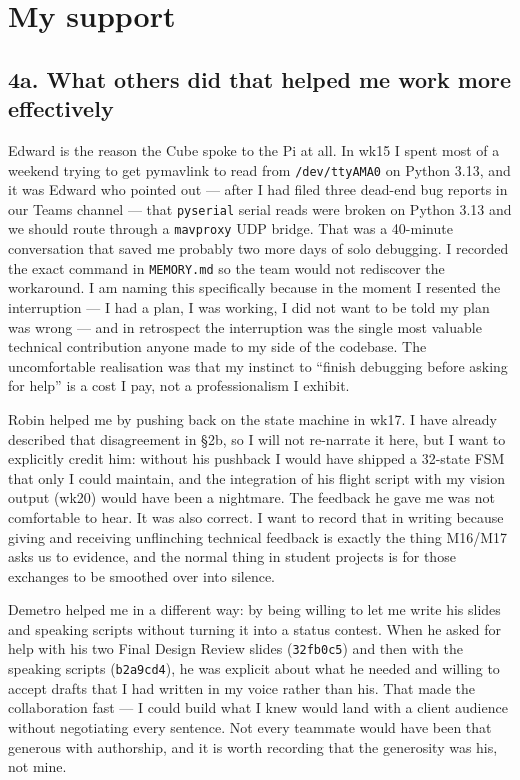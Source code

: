 \section{My support}

\subsection*{4a. What others did that helped me work more effectively}

Edward is the reason the Cube spoke to the Pi at all. In wk15 I spent most of a weekend trying to get pymavlink to read from \texttt{/dev/ttyAMA0} on Python 3.13, and it was Edward who pointed out --- after I had filed three dead-end bug reports in our Teams channel --- that \texttt{pyserial} serial reads were broken on Python 3.13 and we should route through a \texttt{mavproxy} UDP bridge. That was a 40-minute conversation that saved me probably two more days of solo debugging. I recorded the exact command in \texttt{MEMORY.md} so the team would not rediscover the workaround. I am naming this specifically because in the moment I resented the interruption --- I had a plan, I was working, I did not want to be told my plan was wrong --- and in retrospect the interruption was the single most valuable technical contribution anyone made to my side of the codebase. The uncomfortable realisation was that my instinct to ``finish debugging before asking for help'' is a cost I pay, not a professionalism I exhibit.

Robin helped me by pushing back on the state machine in wk17. I have already described that disagreement in §2b, so I will not re-narrate it here, but I want to explicitly credit him: without his pushback I would have shipped a 32-state FSM that only I could maintain, and the integration of his flight script with my vision output (wk20) would have been a nightmare. The feedback he gave me was not comfortable to hear. It was also correct. I want to record that in writing because giving and receiving unflinching technical feedback is exactly the thing M16/M17 asks us to evidence, and the normal thing in student projects is for those exchanges to be smoothed over into silence.

Demetro helped me in a different way: by being willing to let me write his slides and speaking scripts without turning it into a status contest. When he asked for help with his two Final Design Review slides (\texttt{32fb0c5}) and then with the speaking scripts (\texttt{b2a9cd4}), he was explicit about what he needed and willing to accept drafts that I had written in my voice rather than his. That made the collaboration fast --- I could build what I knew would land with a client audience without negotiating every sentence. Not every teammate would have been that generous with authorship, and it is worth recording that the generosity was his, not mine.

